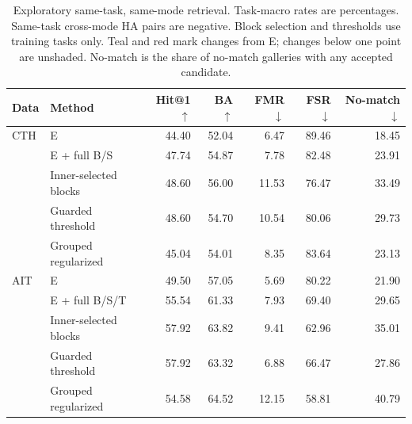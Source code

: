 \documentclass[10pt]{article}
\begin{document}
\begin{table}[!htbp]
\centering

\caption{Exploratory same-task, same-mode retrieval. Task-macro rates are percentages. Same-task cross-mode HA pairs are negative. Block selection and thresholds use training tasks only. Teal and red mark changes from E; changes below one point are unshaded. No-match is the share of no-match galleries with any accepted candidate.}
\label{tab:same-mode-selected}
\begin{tabular}{@{}llrrrrr@{}}
\toprule
Data & Method & Hit@1 $\uparrow$ & BA $\uparrow$ & FMR $\downarrow$ & FSR $\downarrow$ & No-match $\downarrow$ \\
\midrule
CTH & E & 44.40 & 52.04 & 6.47 & 89.46 & 18.45 \\
 & E + full B/S & \cellcolor{AblGoodMid}47.74 & \cellcolor{AblGoodLight}54.87 & \cellcolor{AblBadLight}7.78 & \cellcolor{AblGoodMid}82.48 & \cellcolor{AblBadMid}23.91 \\
 & Inner-selected blocks & \cellcolor{AblGoodMid}48.60 & \cellcolor{AblGoodMid}56.00 & \cellcolor{AblBadMid}11.53 & \cellcolor{AblGoodDeep}76.47 & \cellcolor{AblBadDeep}33.49 \\
 & Guarded threshold & \cellcolor{AblGoodMid}48.60 & \cellcolor{AblGoodLight}54.70 & \cellcolor{AblBadMid}10.54 & \cellcolor{AblGoodDeep}80.06 & \cellcolor{AblBadDeep}29.73 \\
 & Grouped regularized & 45.04 & \cellcolor{AblGoodLight}54.01 & \cellcolor{AblBadLight}8.35 & \cellcolor{AblGoodMid}83.64 & \cellcolor{AblBadMid}23.13 \\
\midrule
AIT & E & 49.50 & 57.05 & 5.69 & 80.22 & 21.90 \\
 & E + full B/S/T & \cellcolor{AblGoodMid}55.54 & \cellcolor{AblGoodMid}61.33 & \cellcolor{AblBadLight}7.93 & \cellcolor{AblGoodDeep}69.40 & \cellcolor{AblBadMid}29.65 \\
 & Inner-selected blocks & \cellcolor{AblGoodDeep}57.92 & \cellcolor{AblGoodMid}63.82 & \cellcolor{AblBadMid}9.41 & \cellcolor{AblGoodDeep}62.96 & \cellcolor{AblBadDeep}35.01 \\
 & Guarded threshold & \cellcolor{AblGoodDeep}57.92 & \cellcolor{AblGoodMid}63.32 & \cellcolor{AblBadLight}6.88 & \cellcolor{AblGoodDeep}66.47 & \cellcolor{AblBadMid}27.86 \\
 & Grouped regularized & \cellcolor{AblGoodMid}54.58 & \cellcolor{AblGoodMid}64.52 & \cellcolor{AblBadMid}12.15 & \cellcolor{AblGoodDeep}58.81 & \cellcolor{AblBadDeep}40.79 \\
\bottomrule
\end{tabular}
\end{table}
\end{document}
